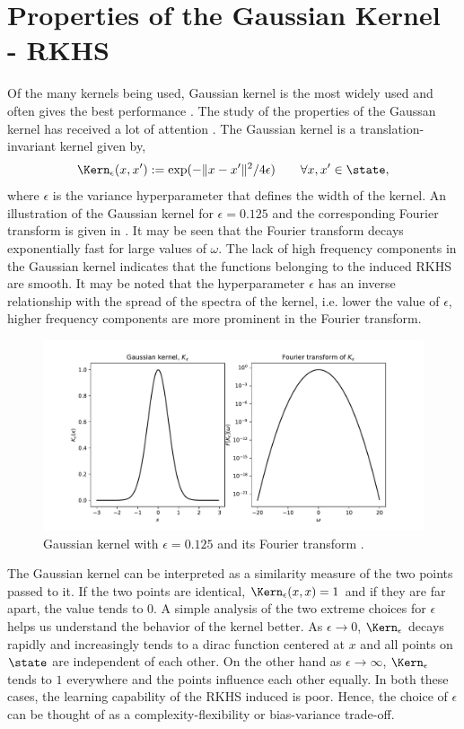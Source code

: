 \chapter{Properties of the Gaussian Kernel -  RKHS}%
\label{a:gaussian_rkhs}

Of the many kernels being used, Gaussian kernel is the most widely used and often gives the best performance \cite{min10}. The study of the properties of the Gaussan kernel has received a lot of attention \cite{stehussco06, min10,micchaxuzha06}. The Gaussian kernel is a translation-invariant kernel given by,
\begin{equation}
\Kern_{\epsilon}(x,x') := \exp(-\|x - x'\|^2/ 4\epsilon) \qquad \forall x,x' \in \state,
\end{equation}
where $\epsilon$ is the variance hyperparameter that defines the width of the kernel. An illustration of the Gaussian kernel for $\epsilon = 0.125$ and the corresponding Fourier transform is given in . It may be seen that the Fourier transform decays exponentially fast for large values of $\omega$. The lack of high frequency components in the Gaussian kernel indicates that the functions belonging to the induced RKHS are smooth. It may be noted that the hyperparameter $\epsilon$ has an inverse relationship with the spread of the spectra of the kernel, i.e. lower the value of $\epsilon$, higher frequency components are more prominent in the Fourier transform. 
\begin{figure}[htbp]
	\centering
	\includegraphics[width=6in]{images/Chap3_Gaussian_kernel}
	\caption{Gaussian kernel with $\epsilon = 0.125$ and its Fourier transform \cite{schsmo01}.}
	\label{fig:gaussian_kernel}
\end{figure}

The Gaussian kernel can be interpreted as a similarity measure of the two points passed to it. If the two points are identical, $\Kern_{\epsilon}(x,x) = 1$ and if they are far apart, the value tends to $0$. 
A simple analysis of the two extreme choices for $\epsilon$ helps us understand the behavior of the kernel better.  As $\epsilon \to 0$, $\Kern_{\epsilon}$ decays rapidly and increasingly tends to a dirac function centered at $x$ and all points on $\state$ are independent of each other. On the other hand as $\epsilon \to \infty$, $\Kern_\epsilon$ tends to $1$ everywhere and the points influence each other equally. In both these cases, the learning capability of the RKHS induced is poor. Hence, the choice of $\epsilon$ can be thought of as a complexity-flexibility or bias-variance trade-off.   

